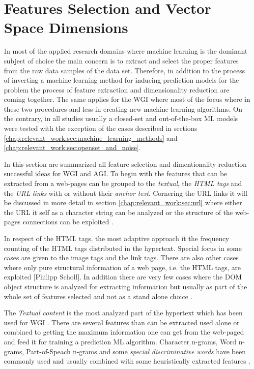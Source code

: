 \section{Features Selection and Vector Space Dimensions}\label{chap:relevant_work:sec:features}

In most of the applied research domains where machine learning is the dominant subject of choice the main concern is to extract and select the proper features from the raw data samples of the data set. Therefore, in addition to the process of inverting a machine learning method for inducing prediction models for the problem the process of feature extraction and dimensionality reduction are coming together. The same applies for the WGI where most of the focus where in these two procedures and less in creating new machine learning algorithms. On the contrary, in all studies usually a closed-set and out-of-the-box ML models were tested with the exception of the cases described in sections \ref{chap:relevant_work:sec:machine_learning_methods} and \ref{chap:relevant_work:sec:openset_and_noise}.

In this section are summarized all feature selection and dimentionality reduction successful ideas for WGI and AGI. To begin with the features that can be extracted from a web-pages can be grouped to the \textit{textual}, the \textit{HTML tags} and the \textit{URL links} with or without their \textit{anchor text}. Cornering the URL links it will be discussed in more detail in section \ref{chap:relevant_work:sec:url} where either the URL it self as a character string can be analyzed or the structure of the web-pages connections can be exploited \parencite{abramson2012_URL,asheghi2014semi,jebari2014pure_URL,priyatam2013don_URL,zhu2011enhance}. 

In respect of the HTML tags, the most adaptive approach it the frequency counting of the HTML tags distributed in the hypertext. Special focus in some cases are given to the image tags and the link tags\parencite{Lim2005,levering2008using}.  There are also other cases where only pure structural information of a web page, i.e. the HTML tags, are exploited {[}Philipp Scholl{]}. In addition there are very few cases where the DOM object structure is analyzed for extracting information but usually as part of the whole set of features selected and not as a stand alone choice \parencite{mehler2011integrating}.

The \textit{Textual content} is the most analyzed part of the hypertext which has been used for WGI \parencite{mason2009distance,Sharroff2010}. There are several features than can be extracted used alone or combined to getting the maximum information one can get from the web-paged and feed it for training a prediction ML algorithm. Character n-grams, Word n-grams, Part-of-Speach n-grams and some \textit{special discriminative words} have been commonly used and usually combined with some heuristically extracted features \parencite{kanaris2009learning,kumari2014web,levering2008using,Lim2005,mason2009n,onan2018ensemble,petrenz2011stable,sharoff2010web,Nooralahzadeh2014}.

